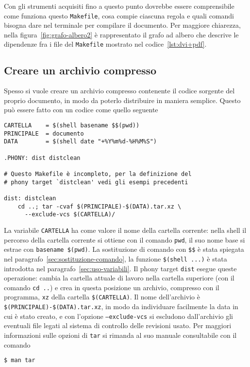 Con gli strumenti acquisiti fino a questo punto dovrebbe essere comprensibile
come funziona questo \texttt{Makefile}, cosa compie ciascuna regola e quali
comandi bisogna dare nel terminale per compilare il documento.  Per maggiore
chiarezza, nella figura~\ref{fig:grafo-albero2} è rappresentato il grafo ad
albero che descrive le dipendenze fra i file del \texttt{Makefile} mostrato nel
codice~\ref{lst:dvi+pdf}.

\subsection{Creare un archivio compresso}
\label{sec:creare-archivio}

Spesso si vuole creare un archivio compresso contenente il codice sorgente del
proprio documento, in modo da poterlo distribuire in maniera semplice.  Questo
può essere fatto con un codice come quello seguente
\begin{lstlisting}
CARTELLA	= $(shell basename $$(pwd))
PRINCIPALE	= documento
DATA		= $(shell date "+%Y%m%d-%H%M%S")

.PHONY: dist distclean

# Questo Makefile è incompleto, per la definizione del
# phony target `distclean' vedi gli esempi precedenti

dist: distclean
	cd ..; tar -cvaf $(PRINCIPALE)-$(DATA).tar.xz \
	  --exclude-vcs $(CARTELLA)/
\end{lstlisting} %
La variabile \texttt{CARTELLA} ha come valore il nome della cartella corrente:
nella shell il percorso della cartella corrente si ottiene con il comando
\texttt{pwd}, il suo nome base si estrae con \texttt{basename \$(pwd)}.  La
sostituzione di comando con \texttt{\$\$} è stata spiegata nel
paragrafo~\ref{sec:sostituzione-comando}, la funzione \texttt{\$(shell ...)} è
stata introdotta nel paragrafo~\ref{sec:uso-variabili}.  Il phony target
\texttt{dist} esegue queste operazione: cambia la cartella attuale di lavoro
nella cartella superiore (con il comando \texttt{cd ..}) e crea in questa
posizione un archivio, compresso con il programma, \texttt{xz} della cartella
\texttt{\$(CARTELLA)}.  Il nome dell'archivio è
\texttt{\$(PRINCIPALE)-\$(DATA).tar.xz}, in modo da individuare facilmente la
data in cui è stato creato, e con l'opzione \texttt{--exclude-vcs} si escludono
dall'archivio gli eventuali file legati al sistema di controllo delle revisioni
usato.  Per maggiori informazioni sulle opzioni di \texttt{tar} si rimanda al
suo manuale consultabile con il comando
\begin{verbatim}
$ man tar
\end{verbatim} %

